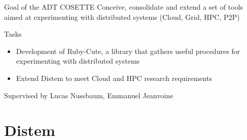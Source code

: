 \documentclass[11pt,xcolor=dvipsnames,presentation]{beamer}
\let\tmptableofcontents=\tableofcontents
\def\tableofcontents{}
\begin{document}
\begin{frame}[label=sec-1-0-3]{Goal of the ADT COSETTE}
Conceive, consolidate and extend a set of tools
aimed at experimenting with distributed systems
(Cloud, Grid, HPC, P2P)

\begin{block}{Tasks}
\begin{itemize}
\item Development of Ruby-Cute, a library that gathers useful
procedures for experimenting with distributed systems
\item \alert{Extend Distem to meet Cloud and HPC research requirements}
\end{itemize}
\end{block}


\begin{block}{Supervised by}
Lucas Nussbaum, Emmanuel Jeanvoine
\end{block}
\end{frame}



\section{Distem}
\label{sec-2}
\let\tableofcontents=\tmptableofcontents
{}

\end{document}

